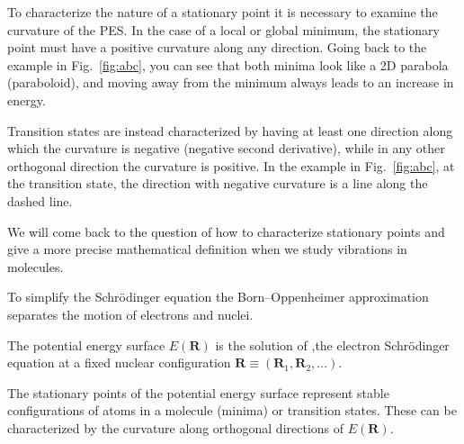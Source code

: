\documentclass[../Main/chem371-notes.tex]{subfiles}
\begin{document}
To characterize the nature of a stationary point it is necessary to examine the curvature of the PES.
In the case of a local or global minimum, the stationary point must have a positive curvature along any direction.
Going back to the example in Fig.~\ref{fig:abc}, you can see that both minima look like a 2D parabola (paraboloid), and moving away from the minimum always leads to an increase in energy.

Transition states are instead characterized by having at least one direction along which the curvature is negative (negative second derivative), while in any other orthogonal direction the curvature is positive.
In the example in Fig.~\ref{fig:abc}, at the transition state, the direction with negative curvature is a line along the dashed line.

We will come back to the question of how to characterize stationary points and give a more precise mathematical definition when we study vibrations in molecules.

\begin{summary}
\item To simplify the Schr\"{o}dinger equation the Born--Oppenheimer approximation separates the motion of electrons and nuclei.
\item The potential energy surface $E(\mathbf{R})$ is the solution of ,the electron Schr\"{o}dinger equation at a fixed nuclear configuration $ \mathbf{R} \equiv (\mathbf{R}_1,\mathbf{R}_2,\ldots)$.
\item The stationary points of the potential energy surface represent stable configurations of atoms in a molecule (minima) or transition states. These can be characterized by the curvature along orthogonal directions of $E(\mathbf{R})$.
\end{summary}
\end{document}
